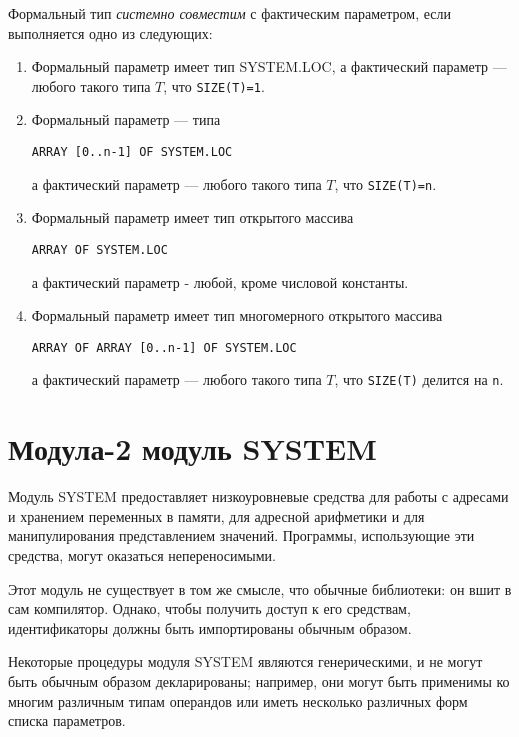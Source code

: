 Формальный тип {\em системно совместим} с фактическим параметром,
если выполняется одно из следующих:
\renewcommand{\theenumi}{\alph{enumi}}
\begin{enumerate}
\item   Формальный параметр имеет тип SYSTEM.LOC,
а фактический параметр --- любого такого типа 
$T$, что {\tt SIZE(T)=1}.

\item   Формальный параметр --- типа
\begin{verbatim}
ARRAY [0..n-1] OF SYSTEM.LOC
\end{verbatim}
а фактический параметр --- любого такого типа 
$T$, что {\tt SIZE(T)=n}.

\item   Формальный параметр имеет тип открытого массива
\begin{verbatim}
ARRAY OF SYSTEM.LOC
\end{verbatim}
а фактический параметр - любой, кроме числовой константы.

\item   Формальный параметр имеет тип многомерного открытого массива

\begin{verbatim}
ARRAY OF ARRAY [0..n-1] OF SYSTEM.LOC
\end{verbatim}
а фактический параметр --- любого такого типа 
$T$, что {\tt SIZE(T)} делится на {\tt n}.

\end{enumerate}
\renewcommand{\theenumi}{\arabic{enumi}}

\section{Модула-2 модуль SYSTEM}
\label{m2:ISO:system}

Модуль SYSTEM предоставляет низкоуровневые средства для работы с 
адресами и хранением переменных в памяти, для адресной арифметики
и для манипулирования представлением значений. Программы,
использующие эти средства, могут оказаться непереносимыми.

Этот модуль не существует в том же смысле, что обычные библиотеки:
он вшит в сам компилятор. Однако, чтобы получить доступ к его
средствам, идентификаторы должны быть импортированы обычным образом.

Некоторые процедуры модуля SYSTEM являются генерическими, и не могут
быть обычным образом декларированы; например, они могут быть применимы 
ко многим различным типам операндов или иметь несколько различных форм
списка параметров. 

